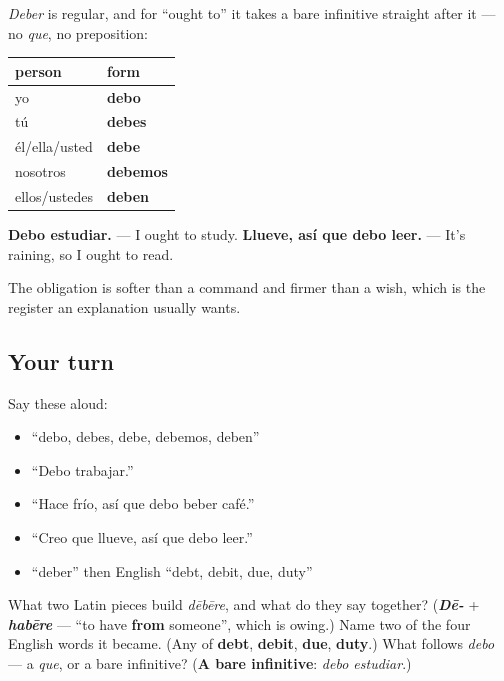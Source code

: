 \begin{grammarlens}[title={Grammar Lens: debo + infinitive}]
\emph{Deber} is regular, and for \textquotedblleft{}ought to\textquotedblright{} it takes a bare infinitive straight after it — no \emph{que}, no preposition:

\noindent
\begin{tabularx}{\linewidth}{@{}>{\raggedright\arraybackslash}X>{\raggedright\arraybackslash}X@{}}
\toprule
\textbf{person} & \textbf{form} \\
\midrule
yo & \textbf{debo} \\
tú & \textbf{debes} \\
él/ella/usted & \textbf{debe} \\
nosotros & \textbf{debemos} \\
ellos/ustedes & \textbf{deben} \\
\bottomrule
\end{tabularx}

\textbf{Debo estudiar.} — I ought to study. \textbf{Llueve, así que debo leer.} — It's raining, so I ought to read.

The obligation is softer than a command and firmer than a wish, which is the register an explanation usually wants.
\end{grammarlens}

\subsection*{Your turn}
Say these aloud:

\begin{itemize}
\raggedright
  \item \textquotedblleft{}debo, debes, debe, debemos, deben\textquotedblright{}
  \item \textquotedblleft{}Debo trabajar.\textquotedblright{}
  \item \textquotedblleft{}Hace frío, así que debo beber café.\textquotedblright{}
  \item \textquotedblleft{}Creo que llueve, así que debo leer.\textquotedblright{}
  \item \textquotedblleft{}deber\textquotedblright{} then English \textquotedblleft{}debt, debit, due, duty\textquotedblright{}
\end{itemize}

\begin{tcolorbox}[breakable,colback=teal!4,colframe=teal!35!black,title={Before you move on}]
What two Latin pieces build \emph{dēbēre}, and what do they say together? (\emph{\textbf{Dē-}} + \emph{\textbf{habēre}} — \textquotedblleft{}to have \textbf{from} someone\textquotedblright{}, which is owing.) Name two of the four English words it became. (Any of \textbf{debt}, \textbf{debit}, \textbf{due}, \textbf{duty}.) What follows \emph{debo} — a \emph{que}, or a bare infinitive? (\textbf{A bare infinitive}: \emph{debo estudiar}.)
\end{tcolorbox}
